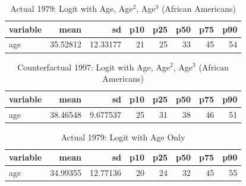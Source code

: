 \documentclass[11pt]{article}
\begin{document}
\begin{table}[H]\centering
	\caption{Actual 1979: Logit with Age, Age$^2$, Age$^3$ (African Americans)}{\label{} 
		\textbf{} }\begin{tabular} {@{} l r r r r r r r @{}} \\ \hline
		\textbf{variable } & \textbf{      mean} & \textbf{        sd} & \textbf{       p10} &
		\textbf{       p25} & \textbf{       p50} & \textbf{       p75} & \textbf{       p90} \\
		\hline
		age  &   35.52812 &   12.33177 &         21 &         25 &         33 &        
		45 &         54 \\
		\hline
	\end{tabular}
\end{table}

\begin{table}[H]\centering
	\caption{Counterfactual 1997: Logit with Age, Age$^2$, Age$^3$ (African Americans)}{\label{} 
		\textbf{} }\begin{tabular} {@{} l r r r r r r r @{}} \\ \hline
		\textbf{variable } & \textbf{      mean} & \textbf{        sd} & \textbf{       p10} &
		\textbf{       p25} & \textbf{       p50} & \textbf{       p75} & \textbf{       p90} \\
		\hline
		age  &   38.46548 &   9.677537 &         25 &         31 &         38 &        
		46 &         51 \\
		\hline
	\end{tabular}
\end{table}

\begin{table}[H]\centering
	\caption{Actual 1979: Logit with Age Only}{\label{} 
		\textbf{} }\begin{tabular} {@{} l r r r r r r r @{}} \\ \hline
		\textbf{variable } & \textbf{      mean} & \textbf{        sd} & \textbf{       p10} &
		\textbf{       p25} & \textbf{       p50} & \textbf{       p75} & \textbf{       p90} \\
		\hline
		age  &   34.99355 &   12.77136 &         20 &         24 &         32 &        
		45 &         55 \\
		\hline
	\end{tabular}
\end{table}
\end{document}

